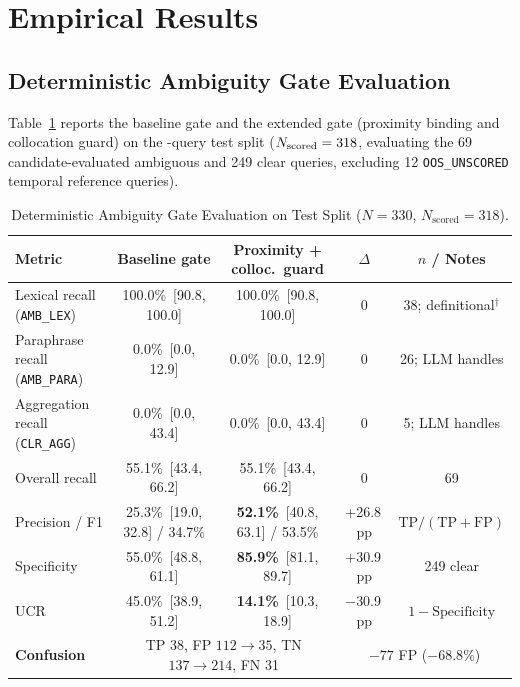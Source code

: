 \section{Empirical Results}
\label{sec:results}

\subsection{Deterministic Ambiguity Gate Evaluation}
Table~\ref{tab:gate_metrics} reports the baseline gate and the extended gate (proximity binding and collocation guard) on the \numTotalQueries{}-query test split ($N_{\text{scored}} = 318{}$, evaluating the 69 candidate-evaluated ambiguous and 249 clear queries, excluding 12 \texttt{OOS\_UNSCORED} temporal reference queries).

\begin{table}[t]
\centering
\caption{Deterministic Ambiguity Gate Evaluation on Test Split ($N = 330$, $N_{\text{scored}} = 318$).}
\label{tab:gate_metrics}
\begin{tabular}{lcccc}
\toprule
\textbf{Metric} & \textbf{Baseline gate} & \textbf{Proximity + colloc.\ guard} & \textbf{$\Delta$} & \textbf{$n$ / Notes} \\
\midrule
Lexical recall (\texttt{AMB\_LEX}) & 100.0\%~{\scriptsize[90.8, 100.0]} & 100.0\%~{\scriptsize[90.8, 100.0]} & 0 & 38; definitional$^{\dagger}$ \\
Paraphrase recall (\texttt{AMB\_PARA}) & 0.0\%~{\scriptsize[0.0, 12.9]} & 0.0\%~{\scriptsize[0.0, 12.9]} & 0 & 26; LLM handles \\
Aggregation recall (\texttt{CLR\_AGG}) & 0.0\%~{\scriptsize[0.0, 43.4]} & 0.0\%~{\scriptsize[0.0, 43.4]} & 0 & 5; LLM handles \\
Overall recall & 55.1\%~{\scriptsize[43.4, 66.2]} & 55.1\%~{\scriptsize[43.4, 66.2]} & 0 & 69 \\
\midrule
Precision / F1 & 25.3\%~{\scriptsize[19.0, 32.8]} / 34.7\% & \textbf{52.1\%}~{\scriptsize[40.8, 63.1]} / 53.5\% & +26.8\,pp & $\text{TP}/(\text{TP}{+}\text{FP})$ \\
Specificity & 55.0\%~{\scriptsize[48.8, 61.1]} & \textbf{85.9\%}~{\scriptsize[81.1, 89.7]} & +30.9\,pp & 249 clear \\
UCR & 45.0\%~{\scriptsize[38.9, 51.2]} & \textbf{14.1\%}~{\scriptsize[10.3, 18.9]} & $-$30.9\,pp & $1-\text{Specificity}$ \\
\midrule
\textbf{Confusion} & \multicolumn{2}{c}{TP 38, FP $112{\to}35$, TN $137{\to}214$, FN 31} & \multicolumn{2}{c}{$-77$ FP ($-68.8\%$)} \\

\end{tabular}
\end{table}
